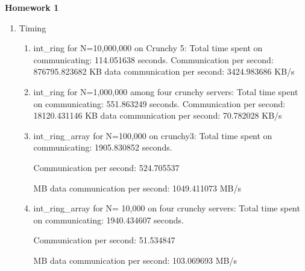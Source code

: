 \documentclass[letterpaper]{article}
\title{}
\author{Kamran-Ubuntu }
\date{2015-03-16}
\newcommand\liststyleLi{%
\renewcommand\theenumi{\arabic{enumi}}
\renewcommand\theenumii{\arabic{enumii}}
\renewcommand\theenumiii{\arabic{enumiii}}
\renewcommand\theenumiv{\arabic{enumiv}}
\renewcommand\labelenumi{\theenumi.}
\renewcommand\labelenumii{\theenumii.}
\renewcommand\labelenumiii{\theenumiii.}
\renewcommand\labelenumiv{\theenumiv.}
}
\begin{document}
{\centering\bfseries
Homework 1
\par}

\liststyleLi
\begin{enumerate}
\item Timing

\begin{enumerate}
\item int\_ring for N=10,000,000 on Crunchy 5:\newline
Total time spent on communicating: 114.051638 seconds. \newline
Communication per second: 876795.823682 \newline
KB data communication per second: 3424.983686 KB/s
\item int\_ring for N=1,000,000 among four crunchy servers:\newline
Total time spent on communicating: 551.863249 seconds. \newline
Communication per second: 18120.431146 \newline
KB data communication per second: 70.782028 KB/s
\item int\_ring\_array for N=100,000 on crunchy3:\newline
Total time spent on communicating: 1905.830852 seconds. 

Communication per second: 524.705537 

MB data communication per second: 1049.411073 MB/s
\item int\_ring\_array for N= 10,000 on four crunchy servers:\newline
Total time spent on communicating: 1940.434607 seconds. 

Communication per second: 51.534847 

MB data communication per second: 103.069693 MB/s
\end{enumerate}
\end{enumerate}
\end{document}
